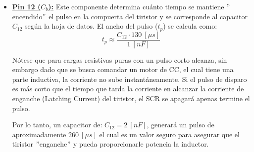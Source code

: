 \documentclass[12pt,a4paper]{article}
\begin{document}
\begin{itemize}
    Por lo tanto, se deduce que si elegimos que:
    \begin{itemize}
        \item $C_{10} = C_{a} = 200 \ [nF]$ la cual se encuentra dentro del rango establecido según la Figura \eqref{fig:fig_12}. 
        \item $V_{11} = 12 \ [V]$ siendo esta la tensión de control, la cual debe respetar el límite impuesto por el fabricante de: $V_{11} < V_{S} - 2 \ [V]$ siendo $V_{S} = V_{CC} = 15 \ [V]$.
        \item $K = 1.10 \pm 20 [\%]$ y $V_{ref} = 3 \ [V]$ según \eqref{eq_18}
        \item Un tiempo de rampa dado por:
        \begin{equation}
            t_{\alpha} = \frac{\alpha_{i}}{360 \ [\degree]} \frac{1}{f} = \frac{70.7}{360(50)} \approx 3.927 \ [ms]
            \label{eq_19}
        \end{equation}
    \end{itemize}
    
    Entonces la resistencia de carga deberá ser igual a:
    \begin{equation}
        R_{i} = R_{9} = \frac{t_{\alpha}V_{ref} K}{V_{11} C_{10}} = \frac{3.927x10^{-3} (3) (1.1)}{12 (200x10^{-9})} \approx 5399.62 \ [\Omega]
        \label{eq_20}
    \end{equation}


    \item \textbf{\underline{Pin 12 ($C_{b}$):}} Este componente determina cuánto tiempo se mantiene $"$encendido$"$ el pulso en la compuerta del tiristor y se corresponde al capacitor $C_{12}$ según la hoja de datos. El ancho del pulso ($t_p$) se calcula como: 
    \begin{equation}
        t_p \approx \frac{C_{12} \cdot 130 \ [\mu s]}{1 \ [nF]}
        \label{eq_21}
    \end{equation}

    Nótese que para cargas resistivas puras con un pulso corto alcanza, sin embargo dado que se busca comandar un motor de CC, el cual tiene una parte inductiva, la corriente no sube instantáneamente. Si el pulso de disparo es más corto que el tiempo que tarda la corriente en alcanzar la corriente de enganche (Latching Current) del tiristor, el SCR se apagará apenas termine el pulso.

    Por lo tanto, un capacitor de: $C_{12} = 2 \ [nF]$, generará un pulso de aproximadamente $260 \ [\mu s]$ el cual es un valor seguro para asegurar que el tiristor $"$enganche$"$ y pueda proporcionarle potencia la inductor.
\end{itemize}
\end{document}

